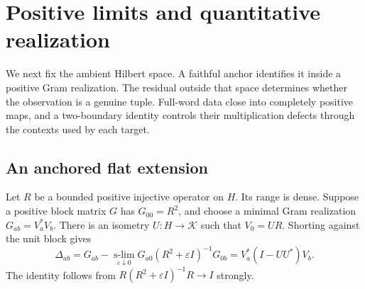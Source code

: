 \documentclass[11pt,a4paper]{amsart}
\numberwithin{equation}{section}
\theoremstyle{definition}
\theoremstyle{remark}
\begin{document}
\section{Positive limits and quantitative realization}\label{sec:realizationboundary}
We next fix the ambient Hilbert space. A faithful anchor identifies it inside a positive Gram realization. The residual outside that space determines whether the observation is a genuine tuple. Full-word data close into completely positive maps, and a two-boundary identity controls their multiplication defects through the contexts used by each target.

\subsection{An anchored flat extension}
Let $R$ be a bounded positive injective operator on $H$. Its range is dense. Suppose a positive block matrix $G$ has $G_{00}=R^2$, and choose a minimal Gram realization $G_{ab}=V_a^*V_b$. There is an isometry $U:H\to\mathcal K$ such that $V_0=UR$. Shorting against the unit block gives
\begin{equation}\label{eq:anchorflat}
 \Delta_{ab}=G_{ab}-\operatorname*{s-lim}_{\varepsilon\downarrow0}
 G_{a0}(R^2+\varepsilon I)^{-1}G_{0b}
 =V_a^*(I-UU^*)V_b.
\end{equation}
The identity follows from $R(R^2+\varepsilon I)^{-1}R\to I$ strongly.
\end{document}
